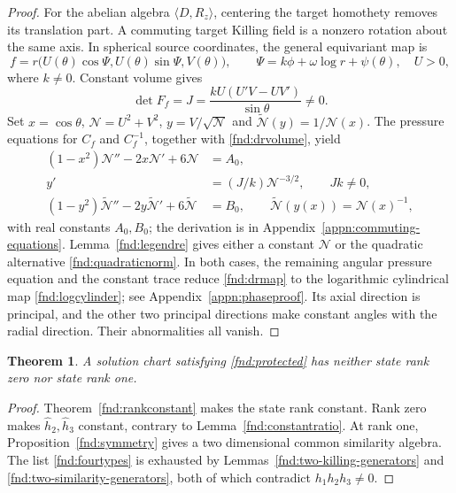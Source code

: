 \documentclass[11pt,a4paper]{article}
\numberwithin{equation}{section}
\theoremstyle{plain}
\newtheorem{theorem}{Theorem}[section]
\theoremstyle{definition}
\theoremstyle{remark}
\begin{document}
\begin{proof}
For the abelian algebra $\langle D,R_z\rangle$, centering the target
homothety removes its translation part. A commuting target Killing
field is a nonzero rotation about the same axis. In spherical source
coordinates, the general equivariant map is
\begin{equation}\label{fnd:drmap}
f=r\bigl(U(\theta)\cos\Psi,U(\theta)\sin\Psi,V(\theta)\bigr),
\qquad \Psi=k\phi+\omega\log r+\psi(\theta),\quad U>0,
\end{equation}
where $k\ne0$. Constant volume gives
\begin{equation}\label{fnd:drvolume}
\det F_f=J=\frac{kU(U'V-UV')}{\sin\theta}\ne0.
\end{equation}
Set $x=\cos\theta$, $\mathcal N=U^2+V^2$,
$y=V/\sqrt{\mathcal N}$ and
$\widetilde{\mathcal N}(y)=1/\mathcal N(x)$.
The pressure equations for $C_f$ and $C_f^{-1}$, together with
\eqref{fnd:drvolume}, yield
\begin{equation}\label{fnd:doublelegendre}
\begin{aligned}
(1-x^2)\mathcal N''-2x\mathcal N'+6\mathcal N&=A_0,\\
y'&=(J/k)\mathcal N^{-3/2},\qquad Jk\ne0,\\
(1-y^2)\widetilde{\mathcal N}''-2y\widetilde{\mathcal N}'+6\widetilde{\mathcal N}&=B_0,
\qquad \widetilde{\mathcal N}(y(x))=\mathcal N(x)^{-1},
\end{aligned}
\end{equation}
with real constants $A_0,B_0$; the derivation is in
Appendix~\ref{appn:commuting-equations}.
Lemma~\ref{fnd:legendre} gives either a constant $\mathcal N$ or
the quadratic alternative \eqref{fnd:quadraticnorm}.
In both cases, the remaining angular pressure equation and the
constant trace reduce \eqref{fnd:drmap} to the logarithmic
cylindrical map \eqref{fnd:logcylinder}; see
Appendix~\ref{appn:phaseproof}. Its axial direction is principal,
and the other two principal directions make constant angles with
the radial direction. Their abnormalities all vanish.
\end{proof}

\begin{theorem}\label{fnd:lowrankexclusion}
A solution chart satisfying \eqref{fnd:protected} has neither state
rank zero nor state rank one.
\end{theorem}
\begin{proof}
Theorem~\ref{fnd:rankconstant} makes the state rank constant.
Rank zero makes $\widehat h_2,\widehat h_3$ constant, contrary to
Lemma~\ref{fnd:constantratio}. At rank one,
Proposition~\ref{fnd:symmetry} gives a two dimensional common
similarity algebra. The list \eqref{fnd:fourtypes} is exhausted by
Lemmas~\ref{fnd:two-killing-generators} and
\ref{fnd:two-similarity-generators}, both of which contradict
$h_1h_2h_3\ne0$.
\end{proof}
\end{document}
